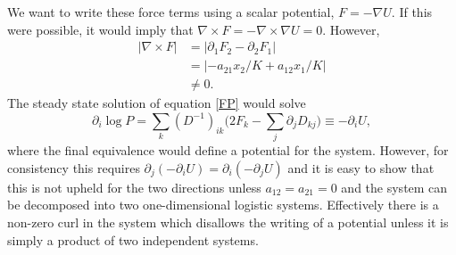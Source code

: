 We want to write these force terms using a scalar potential, $F=-\nabla U$. %
If this were possible, it would imply that $\nabla \times F = -\nabla \times \nabla U = 0$. 
However,%
\begin{align*}
|\nabla \times F| &= |\partial_1 F_2 - \partial_2 F_1| \\
&= |-a_{21}x_2/K + a_{12}x_1/K| \\
&\neq 0.
\end{align*}
The steady state solution of equation \ref{FP} would solve
\begin{equation*}
\partial_i \log P = \sum_k (D^{-1})_{ik} \big( 2 F_k - \sum_j \partial_j D_{kj} \big) \equiv - \partial_i U,
\end{equation*}
where the final equivalence would define a potential for the system. 
However, for consistency this requires $\partial_j \left( - \partial_i U \right) = \partial_i \left( - \partial_j U \right)$ and it is easy to show that this is not upheld for the two directions unless $a_{12}=a_{21}=0$ and the system can be decomposed into two one-dimensional logistic systems. 
Effectively there is a non-zero curl in the system which disallows the writing of a potential unless it is simply a product of two independent systems. 

